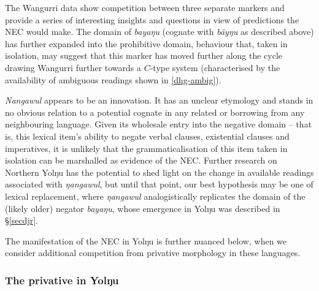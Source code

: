 \xe
{}
The Wangurri data show competition between three separate markers and provide a series of interesting insights and questions in view of predictions the NEC would make. The domain of \textit{bayaŋu} (cognate with \textit{bäyŋu} as described above) has further expanded into the prohibitive domain, behaviour that, taken in isolation, may suggest that this marker has moved further along the cycle drawing Wangurri further towards a $C$-type system (characterised by the availability of ambiguous readings shown in \ref{dhg-ambig}).

\textit{Nangawul} appears to be an innovation. It has an unclear etymology and stands in no obvious relation to a potential cognate in any related or borrowing from any neighbouring language. Given its wholesale entry into the negative domain -- that is, this lexical item's ability to negate verbal clauses, existential clauses and imperatives, it is unlikely that the grammaticalisation of this item taken in isolation can be marshalled as evidence of the NEC. Further research on Northern Yolŋu has the potential to shed light on the change in available readings associated with \textit{ŋangawul}, but until that point, our best hypothesis may be one of lexical replacement, where \textit{ŋangawul} analogistically replicates the domain of the (likely older) negator \textit{bayaŋu}, whose emergence in Yolŋu was described in §\ref{secdjr}.

The manifestation of the NEC in Yolŋu is further nuanced below, when we consider additional competition from privative morphology in these languages.

\subsubsection{The \gls{priv}ative in Yolŋu}\label{yolpriv}


